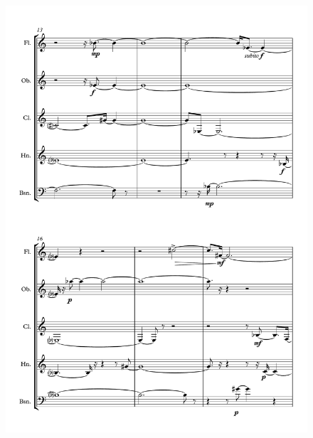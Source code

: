 \begin{figure}[H]
    \centering
	\includegraphics[width=6.5in]{figures/Out_of_Focus_3.pdf}
\end{figure}

